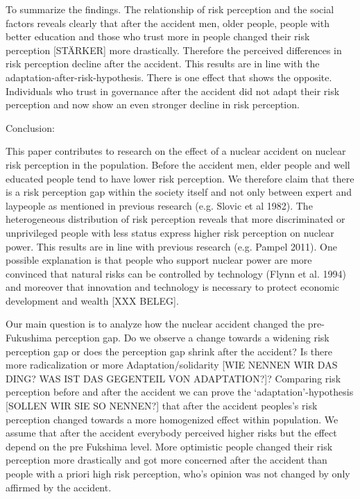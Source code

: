 To summarize the findings. The relationship of risk perception and the social factors reveals clearly that after the accident men, older people,  people with better education and those who trust more in people changed their risk perception [STÄRKER] more drastically. Therefore the perceived differences in risk perception decline after the accident. This results are in line with the adaptation-after-risk-hypothesis. There is one effect that shows the opposite. Individuals who trust in governance after the accident did not adapt their risk perception and now show an even stronger decline in risk perception. 







 Conclusion:  

This paper contributes to research on the effect of a nuclear accident on nuclear risk perception  in the population. Before the accident men, elder people and well educated people tend to have lower risk perception. We therefore claim that there is a risk perception gap within the society itself and not only   between expert and laypeople as mentioned in previous research (e.g. Slovic et al 1982). The heterogeneous distribution of risk perception reveals that  more discriminated or unprivileged people with less status express higher risk perception on nuclear power. This results are in line with previous research (e.g. Pampel 2011). 
One possible explanation is that people who support nuclear power are more convinced that natural risks can be controlled by technology (Flynn et al. 1994) and moreover that innovation and technology is necessary to protect economic development and wealth [XXX BELEG].   




Our main question is to analyze how the nuclear accident changed the pre-Fukushima perception gap. Do we observe a change towards a widening risk perception gap or does the perception gap shrink after the accident? Is there more radicalization or more Adaptation/solidarity [WIE NENNEN WIR DAS DING? WAS IST DAS GEGENTEIL VON ADAPTATION?]? Comparing risk perception before and after the accident we can prove the `adaptation'-hypothesis [SOLLEN WIR SIE SO NENNEN?] that after the accident peoples's risk perception changed towards a more homogenized effect within population. We assume that after the accident everybody perceived higher risks but the effect depend on the pre Fukshima level. More optimistic  people changed their risk perception more drastically and got more concerned after the accident  than people with a priori high risk perception, who's opinion was not changed by only affirmed by the accident. 



